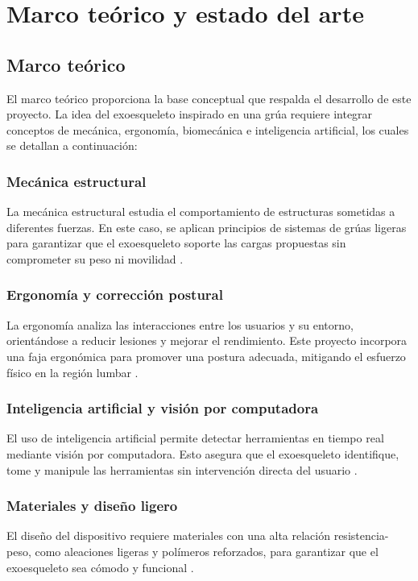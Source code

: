 \chapter{Marco teórico y estado del arte}

\section{Marco teórico}
El marco teórico proporciona la base conceptual que respalda el desarrollo de este proyecto. La idea del exoesqueleto inspirado en una grúa requiere integrar conceptos de mecánica, ergonomía, biomecánica e inteligencia artificial, los cuales se detallan a continuación:

\subsection{Mecánica estructural}
La mecánica estructural estudia el comportamiento de estructuras sometidas a diferentes fuerzas. En este caso, se aplican principios de sistemas de grúas ligeras para garantizar que el exoesqueleto soporte las cargas propuestas sin comprometer su peso ni movilidad \cite{smith2019structuraldesign, lee2020lightweightsystems}.

\subsection{Ergonomía y corrección postural}
La ergonomía analiza las interacciones entre los usuarios y su entorno, orientándose a reducir lesiones y mejorar el rendimiento. Este proyecto incorpora una faja ergonómica para promover una postura adecuada, mitigando el esfuerzo físico en la región lumbar \cite{brown2022ergonomics, liu2023posturalstudy}.

\subsection{Inteligencia artificial y visión por computadora}
El uso de inteligencia artificial permite detectar herramientas en tiempo real mediante visión por computadora. Esto asegura que el exoesqueleto identifique, tome y manipule las herramientas sin intervención directa del usuario \cite{redmon2018yolo, patel2021tooldetection}.

\subsection{Materiales y diseño ligero}
El diseño del dispositivo requiere materiales con una alta relación resistencia-peso, como aleaciones ligeras y polímeros reforzados, para garantizar que el exoesqueleto sea cómodo y funcional \cite{choi2020carbonfiber, park2019lightweight, nguyen2020visionrobotics}.

